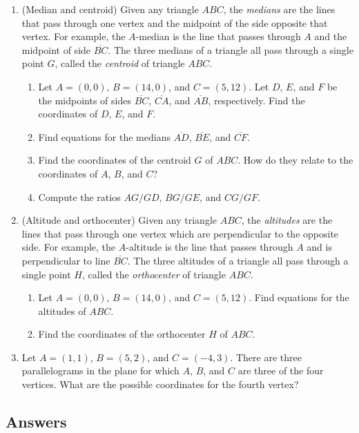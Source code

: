 \begin{enumerate}[resume]
\item (Median and centroid) Given any triangle $ABC$, the \emph{medians} are the lines that pass through one vertex and the midpoint of the side opposite that vertex. For example, the $A$-median is the line that passes through $A$ and the midpoint of side $\overline{BC}$. The three medians of a triangle all pass through a single point $G$, called the \emph{centroid} of triangle $ABC$.
\begin{enumerate}
\item Let $A = (0,0)$, $B = (14,0)$, and $C = (5,12)$. Let $D$, $E$, and $F$ be the midpoints of sides $\overline{BC}$, $\overline{CA}$, and $\overline{AB}$, respectively. Find the coordinates of $D$, $E$, and $F$.
\item Find equations for the medians $\overline{AD}$, $\overline{BE}$, and $\overline{CF}$.
\item Find the coordinates of the centroid $G$ of $ABC$. How do they relate to the coordinates of $A$, $B$, and $C$?
\item Compute the ratios $AG/GD$, $BG/GE$, and $CG/GF$.
\end{enumerate}
\item (Altitude and orthocenter) Given any triangle $ABC$, the \emph{altitudes} are the lines that pass through one vertex which are perpendicular to the opposite side. For example, the $A$-altitude is the line that passes through $A$ and is perpendicular to line $\overline{BC}$. The three altitudes of a triangle all pass through a single point $H$, called the \emph{orthocenter} of triangle $ABC$.
\begin{enumerate}
\item Let $A = (0,0)$, $B = (14,0)$, and $C = (5,12)$. Find equations for the altitudes of $ABC$.
\item Find the coordinates of the orthocenter $H$ of $ABC$.
\end{enumerate}
\item Let $A = (1,1)$, $B = (5,2)$, and $C = (-4,3)$. There are three parallelograms in the plane for which $A$, $B$, and $C$ are three of the four vertices. What are the possible coordinates for the fourth vertex?
\end{enumerate}

\newpage
\subsection{Answers}

